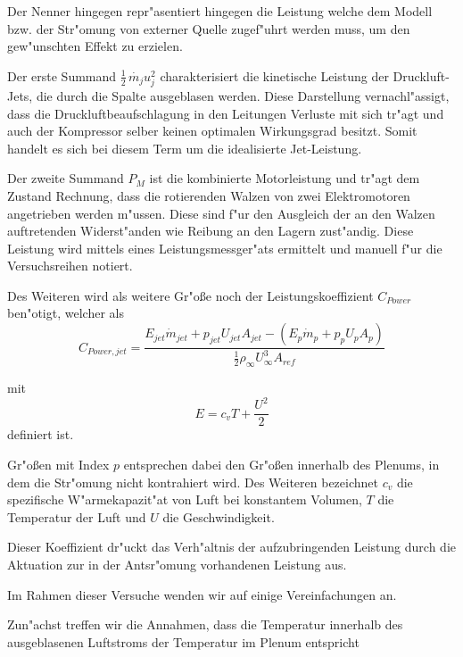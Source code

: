 Der Nenner hingegen repr"asentiert hingegen die Leistung welche dem Modell bzw. der Str"omung von externer Quelle zugef"uhrt werden muss, um den gew"unschten Effekt zu erzielen.

Der erste Summand $\frac{1}{2}\,\dot{m_j} u_j^2$ charakterisiert die kinetische Leistung der Druckluft-Jets, die durch die Spalte ausgeblasen werden. Diese Darstellung vernachl"assigt, dass die  Druckluftbeaufschlagung in den Leitungen Verluste mit sich tr"agt und auch der Kompressor selber keinen optimalen Wirkungsgrad besitzt. Somit handelt es sich bei diesem Term um die idealisierte Jet-Leistung.

Der zweite Summand $ P_M$ ist die kombinierte Motorleistung und tr"agt dem Zustand Rechnung, dass die rotierenden Walzen von zwei Elektromotoren angetrieben werden m"ussen. Diese sind f"ur den Ausgleich der an den Walzen auftretenden Widerst"anden wie Reibung an den Lagern zust"andig.
Diese Leistung wird mittels eines Leistungsmessger"ats ermittelt und manuell f"ur die Versuchsreihen notiert.


Des Weiteren wird als weitere Gr"o\ss{}e noch der Leistungskoeffizient $C_{Power}$ ben"otigt, welcher als
\begin{equation}
	\label{eq:def-powercoefficient}
	C_{Power,jet} = \frac{E_{jet}\dot{m}_{jet} + p_{jet}U_{jet}A_{jet} - (E_p\dot{m}_p + p_p U_p A_p)}{\frac{1}{2}\rho_{\infty}U^3_{\infty} A_{ref}}
\end{equation}

mit
\begin{equation}
	\label{eq:def-energieterm}
	E = c_vT + \frac{U^2}{2}
\end{equation}		
definiert ist.\cite{Hucho.2011}

Gr"o\ss{}en mit Index $p$ entsprechen dabei den Gr"o\ss{}en innerhalb des Plenums, in dem die Str"omung nicht kontrahiert wird.
Des Weiteren bezeichnet $c_v$ die spezifische W"armekapazit"at von Luft bei konstantem Volumen, $T$ die Temperatur der Luft und $U$ die Geschwindigkeit.

Dieser Koeffizient dr"uckt das Verh"altnis der aufzubringenden Leistung durch die Aktuation zur in der Antsr"omung vorhandenen Leistung aus.

Im Rahmen dieser Versuche wenden wir auf  einige Vereinfachungen an. 

Zun"achst treffen wir die Annahmen, dass die Temperatur innerhalb des ausgeblasenen Luftstroms der Temperatur im Plenum entspricht

